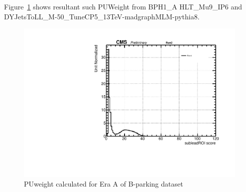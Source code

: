 Figure~\ref{fig:PUWeight9} shows resultant such PUWeight from BPH1\_A HLT\_Mu9\_IP6 and DYJetsToLL\_M-50\_TuneCP5\_13TeV-madgraphMLM-pythia8.
\begin{figure}[h!]
  \caption{PUweight calculated for Era A of B-parking dataset}
  \label{fig:PUWeight9}
  \centering
  \includegraphics[width=0.67\linewidth]{figs/PUWeight_PUWeight.pdf}

\end{figure}
